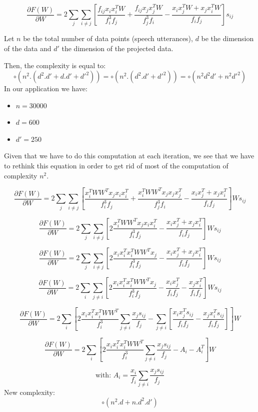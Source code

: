 \documentclass{techrep}
\begin{document}
$$\frac{\partial{F(W)}}{\partial{W}} =
2\sum_{j}\sum_{i\neq{}j}\left[\frac{f_{ij}x_ix_i^TW}{f_i^3f_j} +
  \frac{f_{ij}x_jx_j^TW}{f_j^3f_i} - \frac{x_ix_j^TW + x_jx_i^TW}{f_if_j}\right]s_{ij}$$

Let $n$ be the total number of data points (speech utterances), $d$ be
the dimension of the data and $d'$ the dimension of the projected
data.

Then, the complexity is equal to:
$$\circ{(n^2.(d^2.d'+d.d'+d'^2))} = \circ{(n^2.(d^2.d'+d'^2))} = \circ{(n^2d^2d'+n^2d'^2)}$$
In our application we have:
\begin{itemize}
  \item $n = 30000$
  \item $d = 600$
  \item $d' = 250$
\end{itemize}

Given that we have to do this computation at each iteration, we see
that we have to rethink this equation in order to get rid of most of
the computation of complexity $n^2$.

$$\frac{\partial{F(W)}}{\partial{W}} =
2\sum_{j}\sum_{i\neq{}j}\left[\frac{x_i^TWW^Tx_jx_ix_i^T}{f_i^3f_j} +
  \frac{x_i^TWW^Tx_jx_jx_j^T}{f_j^3f_i} - \frac{x_ix_j^T + x_jx_i^T}{f_if_j}\right]Ws_{ij}$$

$$\frac{\partial{F(W)}}{\partial{W}} =
2\sum_{j}\sum_{i\neq{}j}\left[2\frac{x_i^TWW^Tx_jx_ix_i^T}{f_i^3f_j}
   - \frac{x_ix_j^T + x_jx_i^T}{f_if_j}\right]Ws_{ij}$$

$$\frac{\partial{F(W)}}{\partial{W}} =
2\sum_{j}\sum_{i\neq{}j}\left[2\frac{x_ix_i^Tx_i^TWW^Tx_j}{f_i^3f_j}
   - \frac{x_ix_j^T + x_jx_i^T}{f_if_j}\right]Ws_{ij}$$

$$\frac{\partial{F(W)}}{\partial{W}} =
2\sum_{i}\sum_{j\neq{}i}\left[2\frac{x_ix_i^Tx_i^TWW^Tx_j}{f_i^3f_j}
   - \frac{x_ix_j^T}{f_if_j} - \frac{x_jx_i^T}{f_if_j}\right]Ws_{ij}$$

$$\frac{\partial{F(W)}}{\partial{W}} =
2\sum_{i}\left[2\frac{x_ix_i^Tx_i^TWW^T}{f_i^3}\sum_{j\neq{}i}\frac{x_js_{ij}}{f_j}
  - \sum_{j\neq{}i}\left[\frac{x_ix_j^Ts_{ij}}{f_if_j} - \frac{x_jx_i^Ts_{ij}}{f_if_j}\right]\right]W$$

$$\frac{\partial{F(W)}}{\partial{W}} =
2\sum_{i}\left[2\frac{x_ix_i^Tx_i^TWW^T}{f_i^3}\sum_{j\neq{}i}\frac{x_js_{ij}}{f_j}
  - A_i - A_i^T\right]W$$

$$\text{with: } A_i = \frac{x_i}{f_i}\sum_{j\neq{}i}\frac{x_js_{ij}}{f_j}$$
New complexity: $$\circ{(n^2.d+n.d^2.d')}$$
\end{document}
